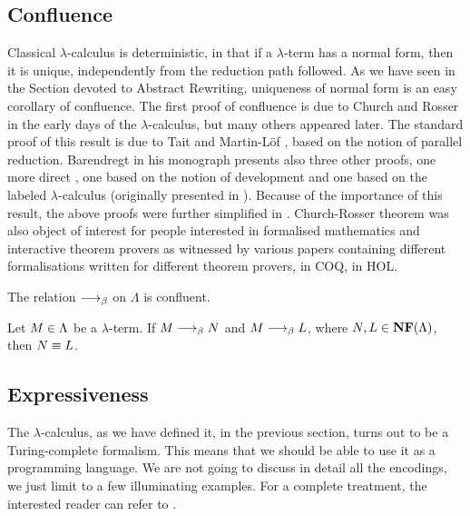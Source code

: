 \subsection{Confluence}
Classical $\lambda$-calculus is deterministic, in that if a $\lambda$-term has a normal form, then it is unique, independently from the reduction path followed. As we have seen in the Section devoted to Abstract Rewriting, uniqueness of normal form is an easy corollary of confluence. The first proof of confluence is due to Church and Rosser \cite{} in the early days of the $\lambda$-calculus, but many others appeared later. The standard proof of this result is due to Tait and Martin-Löf \cite[Section~3.2]{barendregt_lambda_1984}, based on the notion of parallel reduction. Barendregt in his monograph presents also three other proofs, one more direct \cite[Section~11.1]{barendregt_lambda_1984}, one based on the notion of development \cite[Section~11.2]{barendregt_lambda_1984} and one based on the labeled $\lambda$-calculus \cite[Section~14.2]{barendregt_lambda_1984} (originally presented in \cite{}). Because of the importance of this result, the above proofs were further simplified in \cite{}. Church-Rosser theorem was also object of interest for people interested in formalised mathematics and interactive theorem provers as witnessed by various papers containing different formalisations written for different theorem provers, \cite{} in COQ, \cite{} in HOL.
\begin{theorem}
	The relation $\longrightarrow_\beta$ on $\Lambda$ is confluent.
\end{theorem}
\begin{corollary}
	Let $M\in\Lambda$ be a $\lambda$-term. If $M\longrightarrow_\beta N$ and $M\longrightarrow_\beta L$, where $N,L\in\textbf{NF}(\Lambda)$, then $N\equiv L$.
\end{corollary}
\subsection{Expressiveness}
The $\lambda$-calculus, as we have defined it, in the previous section, turns out to be a Turing-complete formalism. This means that we should be able to use it as a programming language. We are not going to discuss in detail all the encodings, we just limit to a few illuminating examples. For a complete treatment, the interested reader can refer to \cite{barendregt_lambda_1984}.
